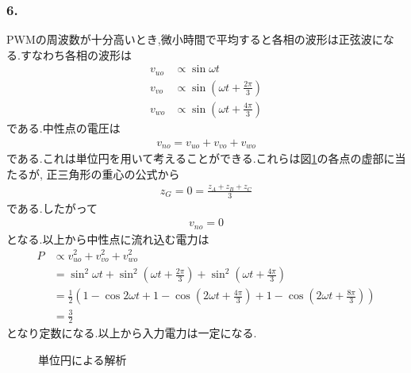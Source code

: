 \subsubsection*{6.}
PWMの周波数が十分高いとき,微小時間で平均すると各相の波形は正弦波になる.すなわち各相の波形は
\begin{align*}
  v_{uo}&\propto \sin\omega t\\
  v_{vo}&\propto \sin\left(\omega t+\frac{2\pi}{3}\right)\\
  v_{wo}&\propto \sin\left(\omega t+\frac{4\pi}{3}\right)
\end{align*}
である.中性点の電圧は
\begin{align*}
  v_{no}=v_{uo}+v_{vo}+v_{wo}
\end{align*}
である.これは単位円を用いて考えることができる.これらは図\ref{fig:circle}の各点の虚部に当たるが,
正三角形の重心の公式から
\begin{align*}
  z_G=0=\frac{z_A+z_B+z_C}{3}
\end{align*}
である.したがって
\begin{align*}
  v_{no}=0
\end{align*}
となる.以上から中性点に流れ込む電力は
\begin{align*}
  P&\propto v_{uo}^2+v_{vo}^2+v_{wo}^2\\
  &=\sin^2\omega t+\sin^2\left(\omega t+\frac{2\pi}{3}\right)+\sin^2\left(\omega t+\frac{4\pi}{3}\right)\\
  &=\frac{1}{2}\left(1-\cos2\omega t+1-\cos\left(2\omega t+\frac{4\pi}{3}\right)+1-\cos\left(2\omega t+\frac{8\pi}{3}\right)\right)\\
  &=\frac{3}{2}
\end{align*}
となり定数になる.以上から入力電力は一定になる.
\begin{figure}[htbp]
  \begin{center}
  \end{center}
  \caption{単位円による解析}
  \label{fig:circle}
\end{figure}